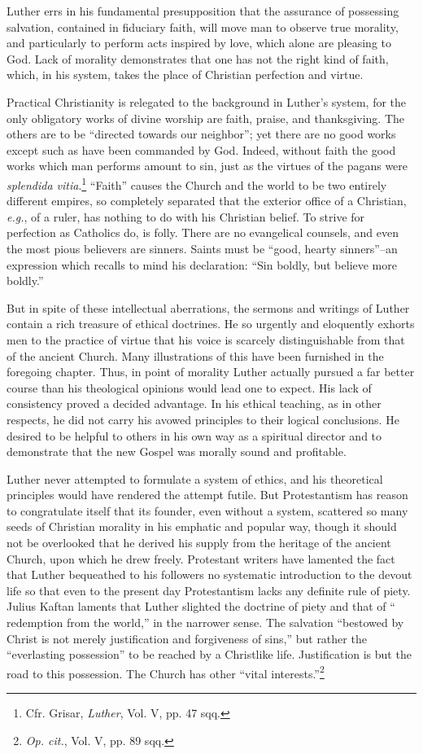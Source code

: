 Luther errs in his fundamental presupposition that the assurance
of possessing salvation, contained in fiduciary faith, will move man to
observe true morality, and particularly to perform acts inspired by
love, which alone are pleasing to God. Lack of morality demonstrates
that one has not the right kind of faith, which, in his system, takes
the place of Christian perfection and virtue.

Practical Christianity is relegated to the background in Luther’s
system, for the only obligatory works of divine worship are faith,
praise, and thanksgiving. The others are to be “directed towards our
neighbor”; yet there are no good works except such as have been commanded
by God. Indeed, without faith the good works which man
performs amount to sin, just as the virtues of the pagans were
\textit{splendida vitia}.\footnote{Cfr. Grisar, \textit{Luther}, Vol. V, pp. 47 sqq.}
“Faith” causes the Church and the world to be two
entirely different empires, so completely separated that the exterior
office of a Christian, \textit{e.g.}, of a ruler, has nothing to do with
his Christian belief. To strive for perfection as Catholics do, is folly. There are
no evangelical counsels, and even the most pious believers are sinners.
Saints must be “good, hearty sinners”--an expression which recalls to
mind his declaration: “Sin boldly, but believe more boldly.”

But in spite of these intellectual aberrations, the sermons and writings
of Luther contain a rich treasure of ethical doctrines. He so
urgently and eloquently exhorts men to the practice of virtue that
his voice is scarcely distinguishable from that of the ancient Church.
Many illustrations of this have been furnished in the foregoing chapter.
Thus, in point of morality Luther actually pursued a far better
course than his theological opinions would lead one to expect. His
lack of consistency proved a decided advantage. In his ethical teaching,
as in other respects, he did not carry his avowed principles to
their logical conclusions. He desired to be helpful to others in his own
way as a spiritual director and to demonstrate that the new Gospel
was morally sound and profitable.

Luther never attempted to formulate a system of ethics, and his theoretical
principles would have rendered the attempt futile. But Protestantism has
reason to congratulate itself that its founder, even without a system,
scattered so many seeds of Christian morality in his emphatic and popular way,
though it should not be overlooked that he derived his supply from the
heritage of the ancient Church, upon which he drew freely.
Protestant writers have lamented the fact that Luther bequeathed to his
followers no systematic introduction to the devout life so that even
to the present day Protestantism lacks any definite rule of piety. Julius
Kaftan laments that Luther slighted the doctrine of piety and that of “
redemption from the world,” in the narrower sense. The salvation “bestowed
by Christ is not merely justification and forgiveness of sins,” but rather
the “everlasting possession” to be reached by a Christlike life. Justification
is but the road to this possession. The Church has other “vital interests.”\footnote{\textit{Op. cit.}, Vol. V, pp. 89 sqq.}

